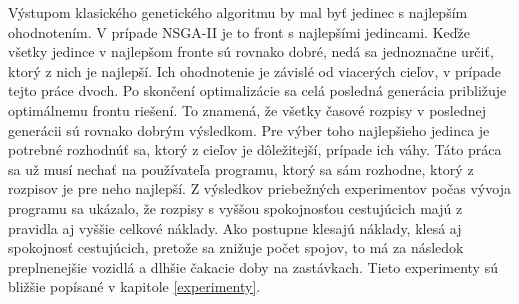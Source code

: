 Výstupom klasického genetického algoritmu by mal byť jedinec s najlepším ohodnotením.
V prípade NSGA-II je to front s najlepšími jedincami.
Keďže všetky jedince v najlepšom fronte sú rovnako dobré, nedá sa jednoznačne určiť, ktorý z nich je najlepší.
Ich ohodnotenie je závislé od viacerých cieľov, v prípade tejto práce dvoch.
Po skončení optimalizácie sa celá posledná generácia približuje optimálnemu frontu riešení.
To znamená, že všetky časové rozpisy v poslednej generácii sú rovnako dobrým výsledkom.
Pre výber toho najlepšieho jedinca je potrebné rozhodnúť sa, ktorý z cieľov je dôležitejší, prípade ich váhy.
Táto práca sa už musí nechať na používateľa programu, ktorý sa sám rozhodne, ktorý z rozpisov je pre neho najlepší.
Z výsledkov priebežných experimentov počas vývoja programu sa ukázalo, že rozpisy s vyššou spokojnosťou cestujúcich majú z pravidla aj vyššie celkové náklady.
Ako postupne klesajú náklady, klesá aj spokojnosť cestujúcich, pretože sa znižuje počet spojov, to má za následok preplnenejšie vozidlá a dlhšie čakacie doby na zastávkach.
Tieto experimenty sú bližšie popísané v kapitole \ref{experimenty}.

